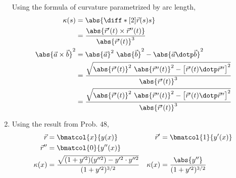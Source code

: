 \begin{enumerate}
          Using the formula of curvature parametrized by arc length,
          \begin{align}
              \kappa(s)                      & = \abs{\diff*[2]{\vec{r}(s)}{s}}  \\
                                             & = \frac{\abs{\vec{r}'(t) \times
                      \vec{r}''(t)}}
              {\abs{\vec{r}'(t)}^3}                                              \\
              \abs{\vec{a} \times \vec{b}}^2 & =
              \abs{\vec{a}}^2\ \abs{\vec{b}}^2 - \abs{\vec{a} \dotp \vec{b}}^2   \\
                                             & = \frac{\sqrt{\abs{\vec{r}'(t)}^2
                      \ \abs{\vec{r}''(t)}^2
                      - \big[ \vec{r}'(t) \dotp \vec{r}'' \big]^2}}
              {\abs{\vec{r}'(t)}^3}                                              \\
                                             & = \frac{\sqrt{\abs{\vec{r}'(t)}^2
                      \ \abs{\vec{r}''(t)}^2
                      - \big[ \vec{r}'(t) \dotp \vec{r}'' \big]^2}}
              {\abs{\vec{r}'(t)}^3}
          \end{align}

    \item Using the result from Prob. $ 48 $,
          \begin{align}
              \vec{r}            & = \bmatcol{x}{y(x)}                  &
              \vec{r}'           & = \bmatcol{1}{y'(x)}                   \\
              \vec{r}''          & = \bmatcol{0}{y''(x)}                  \\
              \kappa(x)          & = \frac{\sqrt{(1 + y'^2)(y''^2)
                      - y'^2 \cdot y''^2}}
              {(1 + y'^2)^{3/2}} &
              \kappa (x)         & = \frac{\abs{y''}}{(1 + y'^2)^{3/2}}
          \end{align}


\end{enumerate}
